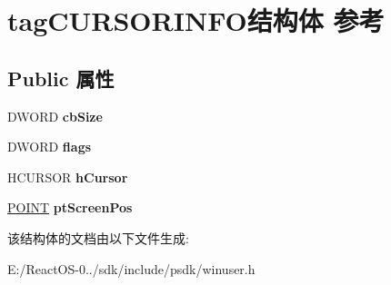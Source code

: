 \hypertarget{structtag_c_u_r_s_o_r_i_n_f_o}{}\section{tag\+C\+U\+R\+S\+O\+R\+I\+N\+F\+O结构体 参考}
\label{structtag_c_u_r_s_o_r_i_n_f_o}
\subsection*{Public 属性}
\begin{DoxyCompactItemize}
\item 
\mbox{\label{structtag_c_u_r_s_o_r_i_n_f_o_a21d32cb78810d4754aaf6fed42d49ed4}} 
D\+W\+O\+RD {\bfseries cb\+Size}
\item 
\mbox{\label{structtag_c_u_r_s_o_r_i_n_f_o_a1ef5400cd8e8fa3a80b88d69d9808456}} 
D\+W\+O\+RD {\bfseries flags}
\item 
\mbox{\label{structtag_c_u_r_s_o_r_i_n_f_o_a701ab866976d031702cbc2bbd8a792cb}} 
H\+C\+U\+R\+S\+OR {\bfseries h\+Cursor}
\item 
\mbox{\label{structtag_c_u_r_s_o_r_i_n_f_o_afb3695b1b2e2b50b3202b0813fd72927}} 
\hyperlink{structtag_p_o_i_n_t}{P\+O\+I\+NT} {\bfseries pt\+Screen\+Pos}
\end{DoxyCompactItemize}


该结构体的文档由以下文件生成\+:\begin{DoxyCompactItemize}
\item 
E\+:/\+React\+O\+S-\/0../sdk/include/psdk/winuser.\+h\end{DoxyCompactItemize}
